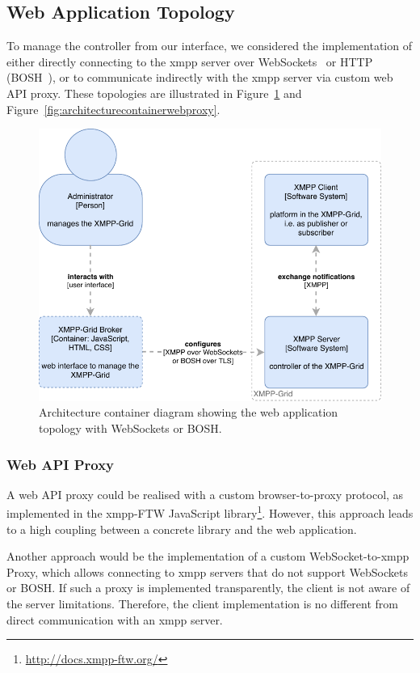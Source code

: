 \subsection{Web Application Topology}

To manage the \gls{controller} from our interface, we considered the implementation of either directly connecting to the \gls{xmpp} server over WebSockets~\cite{rfc7395} or HTTP (BOSH~\cite{xep-0124}), or to communicate indirectly with the \gls{xmpp} server via custom web API proxy.
These topologies are illustrated in Figure~\ref{fig:architecturecontainerwebapplication} and Figure~\ref{fig:architecturecontainerwebproxy}.

\begin{figure}[h]
\centering
\includegraphics[width=0.7\linewidth]{resources/architecture_container_webapplication}
\caption[Architecture container diagram: Web application]{Architecture container diagram showing the web application topology with WebSockets or BOSH.}
\label{fig:architecturecontainerwebapplication}
\end{figure}

\subsubsection{Web API Proxy}

A web API proxy could be realised with a custom browser-to-proxy protocol, as implemented in the \gls{xmpp}-FTW JavaScript library\footnote{\url{http://docs.xmpp-ftw.org/}}.
However, this approach leads to a high coupling between a concrete library and the web application.

Another approach would be the implementation of a custom WebSocket-to-\gls{xmpp} Proxy, which allows connecting to \gls{xmpp} servers that do not support WebSockets or BOSH.
If such a proxy is implemented transparently, the client is not aware of the server limitations.
Therefore, the client implementation is no different from direct communication with an \gls{xmpp} server.

